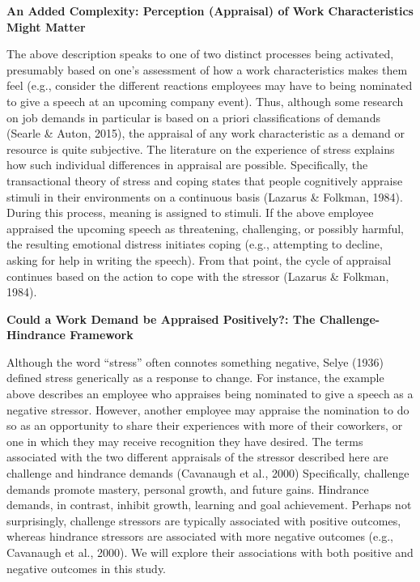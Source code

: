 \documentclass[
  man]{apa6}
\begin{document}
\textbf{An Added Complexity: Perception (Appraisal) of Work Characteristics Might Matter}

The above description speaks to one of two distinct processes being activated, presumably based on one's assessment of how a work characteristics makes them feel (e.g., consider the different reactions employees may have to being nominated to give a speech at an upcoming company event). Thus, although some research on job demands in particular is based on a priori classifications of demands (Searle \& Auton, 2015), the appraisal of any work characteristic as a demand or resource is quite subjective. The literature on the experience of stress explains how such individual differences in appraisal are possible. Specifically, the transactional theory of stress and coping states that people cognitively appraise stimuli in their environments on a continuous basis (Lazarus \& Folkman, 1984). During this process, meaning is assigned to stimuli. If the above employee appraised the upcoming speech as threatening, challenging, or possibly harmful, the resulting emotional distress initiates coping (e.g., attempting to decline, asking for help in writing the speech). From that point, the cycle of appraisal continues based on the action to cope with the stressor (Lazarus \& Folkman, 1984).

\textbf{Could a Work Demand be Appraised Positively?: The Challenge-Hindrance Framework}

Although the word ``stress'' often connotes something negative, Selye (1936) defined stress generically as a response to change. For instance, the example above describes an employee who appraises being nominated to give a speech as a negative stressor. However, another employee may appraise the nomination to do so as an opportunity to share their experiences with more of their coworkers, or one in which they may receive recognition they have desired. The terms associated with the two different appraisals of the stressor described here are challenge and hindrance demands (Cavanaugh et al., 2000) Specifically, challenge demands promote mastery, personal growth, and future gains. Hindrance demands, in contrast, inhibit growth, learning and goal achievement. Perhaps not surprisingly, challenge stressors are typically associated with positive outcomes, whereas hindrance stressors are associated with more negative outcomes (e.g., Cavanaugh et al., 2000). We will explore their associations with both positive and negative outcomes in this study.
\end{document}
